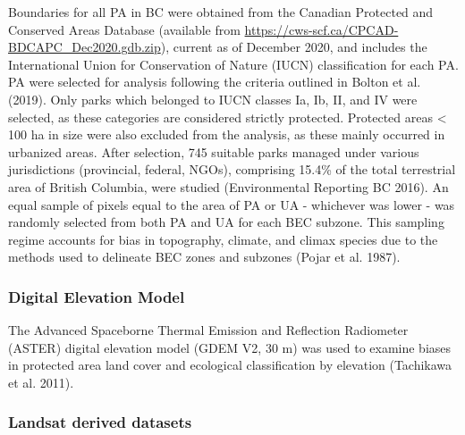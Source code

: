 \documentclass[11pt]{article}
\begin{document}
Boundaries for all PA in BC were obtained from the Canadian Protected
and Conserved Areas Database (available from
\url{https://cws-scf.ca/CPCAD-BDCAPC_Dec2020.gdb.zip}), current as of
December 2020, and includes the International Union for Conservation of
Nature (IUCN) classification for each PA. PA were selected for analysis
following the criteria outlined in Bolton et al. (2019). Only parks
which belonged to IUCN classes Ia, Ib, II, and IV were selected, as
these categories are considered strictly protected. Protected areas
\textless{} 100 ha in size were also excluded from the analysis, as
these mainly occurred in urbanized areas. After selection, 745 suitable
parks managed under various jurisdictions (provincial, federal, NGOs),
comprising 15.4\% of the total terrestrial area of British Columbia,
were studied (Environmental Reporting BC 2016). An equal sample of
pixels equal to the area of PA or UA - whichever was lower - was
randomly selected from both PA and UA for each BEC subzone. This
sampling regime accounts for bias in topography, climate, and climax
species due to the methods used to delineate BEC zones and subzones
(Pojar et al. 1987).

\hypertarget{digital-elevation-model}{%
\subsubsection{Digital Elevation Model}\label{digital-elevation-model}}

The Advanced Spaceborne Thermal Emission and Reflection Radiometer
(ASTER) digital elevation model (GDEM V2, 30 m) was used to examine
biases in protected area land cover and ecological classification by
elevation (Tachikawa et al. 2011).

\hypertarget{landsat-derived-datasets}{%
\subsubsection{Landsat derived
datasets}\label{landsat-derived-datasets}}
\end{document}
